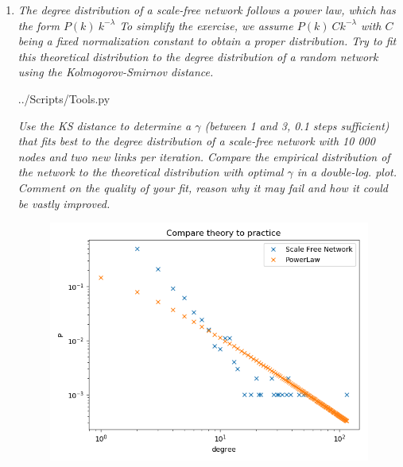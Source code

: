 \documentclass[10pt,a4paper]{article}
\begin{document}
\begin{enumerate}
 {../Scripts/ScaleFreeTest.py}

\item \textit{The degree distribution of a scale-free network follows a power law, which has the form $P(k) ~ k^{-\lambda}$ To simplify the exercise, we assume $P(k) ~ Ck^{-\lambda}$ with $C$ being a fixed normalization
	constant to obtain a proper distribution. Try to fit this theoretical distribution to the
	degree distribution of a random network using the Kolmogorov-Smirnov distance. }


 {../Scripts/Tools.py}

\textit{Use the KS distance to determine a $\gamma$ (between 1 and 3, 0.1 steps sufficient) that fits
	best to the degree distribution of a scale-free network with 10 000 nodes and two new
	links per iteration. Compare the empirical distribution of the network to the theoretical
	distribution with optimal $\gamma$ in a double-log. plot. Comment on the quality of your fit,
	reason why it may fail and how it could be vastly improved.}


\begin{figure}[H]
	\centering
	\includegraphics[width=0.7\linewidth]{"../Scripts/Compare theory to practice"}
	\caption[Theory vs Practice]{}
	\caption{}
	\label{fig:compare-theory-to-practice}
\end{figure}

\end{enumerate}
\end{document}
